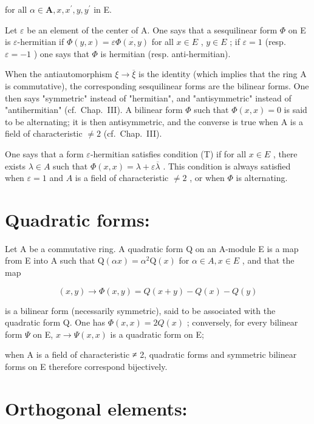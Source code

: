 for all \(\alpha\in\mathbf{A},x,x^{\prime},y,y^{\prime}\) in E.

Let \(\varepsilon\) be an element of the center of A. One says that a sesquilinear form \(\Phi\) on E is \(\varepsilon\)-hermitian if \(\Phi(y, x) = \varepsilon \overline{\Phi(x, y)}\) for all \(x \in E\) , \(y \in E\) ; if \(\varepsilon = 1\) (resp. \(\varepsilon = -1\) ) one says that \(\Phi\) is hermitian (resp. anti-hermitian).

When the antiautomorphism \(\xi\to\overline{\xi}\) is the identity (which implies that the ring A is commutative), the corresponding sesquilinear forms are the bilinear forms. One then says "symmetric" instead of "hermitian", and "antisymmetric" instead of "antihermitian" (cf.~Chap.~III). A bilinear form \(\Phi\) such that \(\Phi(x,x)=0\) is said to be alternating; it is then antisymmetric, and the converse is true when A is a field of characteristic \(\neq2\) (cf.~Chap.~III).

One says that a form \(\varepsilon\)-hermitian satisfies condition (T) if for all \(x \in E\) , there exists \(\lambda \in A\) such that \(\Phi(x, x) = \lambda + \varepsilon \overline{\lambda}\) . This condition is always satisfied when \(\varepsilon = 1\) and \(A\) is a field of characteristic \(\neq 2\) , or when \(\Phi\) is alternating.

\section*{Quadratic forms:}

Let A be a commutative ring. A quadratic form Q on an A-module E is a map from E into A such that \(\mathrm{Q}(\alpha x) = \alpha^{2}\mathrm{Q}(x)\) for \(\alpha \in A, x \in E\) , and that the map

\[
(x, y) \rightarrow \Phi (x, y) = Q (x + y) - Q (x) - Q (y)
\]

is a bilinear form (necessarily symmetric), said to be associated with the quadratic form Q. One has \(\Phi(x, x) = 2Q(x)\) ; conversely, for every bilinear form \(\Psi\) on E, \(x \to \Psi(x, x)\) is a quadratic form on E;

when A is a field of characteristic ≠ 2, quadratic forms and symmetric bilinear forms on E therefore correspond bijectively.

\section*{Orthogonal elements:}

